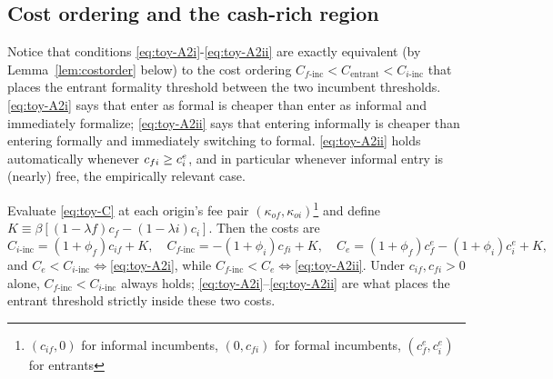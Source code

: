 \documentclass[12pt]{article}
\begin{document}
\subsection{Cost ordering and the cash-rich region}

Notice that conditions \eqref{eq:toy-A2i}-\eqref{eq:toy-A2ii} are exactly equivalent (by Lemma~\ref{lem:costorder} below) to the cost ordering $C_{f\text{-inc}}<C_{\text{entrant}}<C_{i\text{-inc}}$ that places the entrant formality threshold between the two incumbent thresholds. \eqref{eq:toy-A2i} says that enter as formal is cheaper than enter as informal and immediately formalize; \eqref{eq:toy-A2ii} says that entering informally is cheaper than entering formally and immediately switching to formal. \eqref{eq:toy-A2ii} holds automatically whenever $c_{fi}\geq c^{e}_{i}$, and in particular whenever informal entry is (nearly) free, the empirically relevant case.
 
\begin{lemma}
\label{lem:costorder}
Evaluate \eqref{eq:toy-C} at each origin's fee pair $(\kappa_{of},\kappa_{oi})$\footnote{$(c_{if},0)$ for informal incumbents, $(0,c_{fi})$ for formal incumbents, $(c^e_{f},c^e_{i})$ for entrants} and define $K\equiv\beta[(1-\lambda{f})c_{f}-(1-\lambda{i})c_{i}]$. Then the costs are
\begin{equation}
  C_{i\text{-inc}}=(1+\phi_{f})c_{if}+K,\quad
  C_{f\text{-inc}}=-(1+\phi_{i})c_{fi}+K,\quad
  C_{e}=(1+\phi_{f})c^e_{f}-(1+\phi_{i})c^e_{i}+K,
  \label{eq:toy-Cvalues}
\end{equation}
and $C_{e}<C_{i\text{-inc}}\iff$\eqref{eq:toy-A2i}, while $C_{f\text{-inc}}<C_{e}\iff$\eqref{eq:toy-A2ii}. Under $c_{if},c_{fi}>0$ alone, $C_{f\text{-inc}}<C_{i\text{-inc}}$ always holds; \eqref{eq:toy-A2i}--\eqref{eq:toy-A2ii} are what places the entrant threshold strictly inside these two costs.
\end{lemma}
\end{document}
